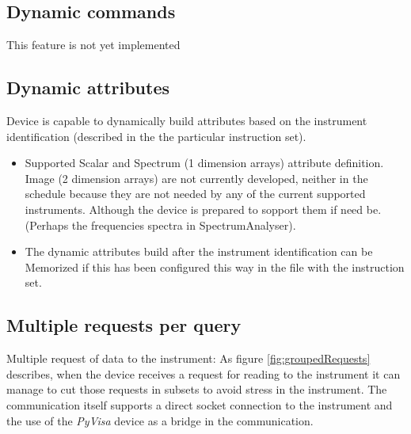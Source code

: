 \documentclass[a4paper,10pt]{article}
\begin{document}
\subsection{Dynamic commands}\label{sec:dynCmds}

This feature is not yet implemented

\subsection{Dynamic attributes}\label{sec:dynAttrs}

Device is capable to dynamically build attributes based on the instrument identification (described in the the particular instruction set).
\begin{itemize}
    \item Supported Scalar and Spectrum (1 dimension arrays) attribute definition. Image (2 dimension arrays) are not currently developed, neither in the schedule because they are not needed by any of the current supported instruments. Although the device is prepared to sopport them if need be. (Perhaps the frequencies spectra in SpectrumAnalyser).
    \item The dynamic attributes build after the instrument identification can be Memorized if this has been configured this way in the file with the instruction set.
\end{itemize}

\subsection{Multiple requests per query}\label{sec:multiquery}

Multiple request of data to the instrument: As figure \ref{fig:groupedRequests} describes, when the device receives a request for reading to the instrument it can manage to cut those requests in subsets to avoid stress in the instrument. The communication itself supports a direct socket connection to the instrument and the use of the \emph{PyVisa} device as a bridge in the communication. 

\begin{figure}[h]
\end{figure}
\end{document}
